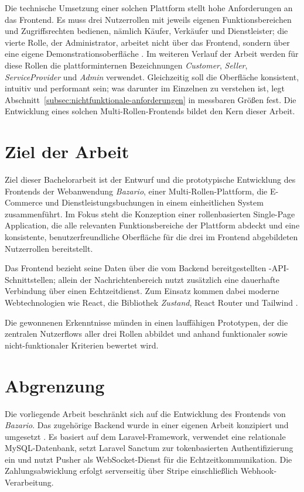 Die technische Umsetzung einer solchen Plattform stellt hohe
Anforderungen an das Frontend. Es muss drei Nutzerrollen mit jeweils
eigenen Funktionsbereichen und Zugriffsrechten bedienen, nämlich
Käufer, Verkäufer und Dienstleister; die vierte Rolle, der Administrator, arbeitet nicht über das
Frontend, sondern über eine eigene Demonstrationsoberfläche \cite{alaatki_backend}. Im weiteren Verlauf
der Arbeit werden für diese
Rollen die plattforminternen Bezeichnungen \textit{Customer},
\textit{Seller}, \textit{ServiceProvider} und \textit{Admin}
verwendet. Gleichzeitig soll die Oberfläche konsistent, intuitiv und
performant sein; was darunter im Einzelnen zu verstehen ist, legt
Abschnitt~\ref{subsec:nichtfunktionale-anforderungen} in messbaren
Größen fest. Die Entwicklung eines solchen Multi-Rollen-Frontends
bildet den Kern dieser Arbeit.

\section{Ziel der Arbeit}
\label{sec:ziel}

Ziel dieser Bachelorarbeit ist der Entwurf und die prototypische
Entwicklung des Frontends der Webanwendung \textit{Bazario}, einer
Multi-Rollen-Plattform, die E-Commerce und Dienstleistungsbuchungen in
einem einheitlichen System zusammenführt. Im Fokus steht die
Konzeption einer rollenbasierten Single-Page Application, die alle
relevanten Funktionsbereiche der Plattform abdeckt und eine
konsistente, benutzerfreundliche Oberfläche für die drei im Frontend
abgebildeten Nutzerrollen bereitstellt.

Das Frontend bezieht seine Daten über die vom Backend bereitgestellten
-API-Schnittstellen; allein der Nachrichtenbereich nutzt
zusätzlich eine dauerhafte Verbindung über einen Echtzeitdienst. Zum
Einsatz kommen dabei moderne Webtechnologien wie React, die Bibliothek
\textit{Zustand}, React Router und Tailwind .

Die gewonnenen Erkenntnisse münden in einen lauffähigen Prototypen,
der die zentralen Nutzerflows aller drei Rollen abbildet und anhand
funktionaler sowie nicht-funktionaler Kriterien bewertet wird.

\section{Abgrenzung}
\label{sec:abgrenzung}

Die vorliegende Arbeit beschränkt sich auf die
Entwicklung des Frontends von \textit{Bazario}. Das zugehörige Backend wurde in einer eigenen Arbeit konzipiert und
umgesetzt \cite{alaatki_backend}. Es basiert auf dem
Laravel-Framework, verwendet eine relationale MySQL-Datenbank,
setzt Laravel Sanctum zur tokenbasierten Authentifizierung ein
und nutzt Pusher als WebSocket-Dienst für die
Echtzeitkommunikation. Die Zahlungsabwicklung erfolgt
serverseitig über Stripe einschließlich Webhook-Verarbeitung.


